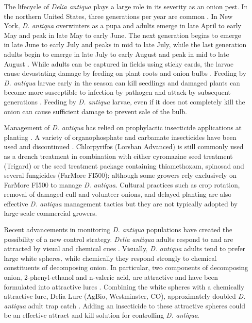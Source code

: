 \documentclass[alpha-refs]{wiley-article}
\begin{document}
The lifecycle of \textit{Delia antiqua} plays a large role in its severity as an onion pest.  In the northern United States, three generations per year are common \citep{eckenrode1975population, hoepting2004insecticide}. In New York, \textit{D. antiqua} overwinters as a pupa and adults emerge in late April to early May and peak in late May to early June. The next generation begins to emerge in late June to early July and peaks in mid to late July, while the last generation adults begin to emerge in late July to early August and peak in mid to late August \citep{nault2011delaying}. While adults can be captured in fields using sticky cards, the larvae cause devastating damage by feeding on plant roots and onion bulbs \citep{nault2006onion, nault2006performance}. Feeding by \textit{D. antiqua} larvae early in the season can kill seedlings and damaged plants can become more susceptible to infection by pathogen and attack by subsequent generations \citep{eckenrode1986impact,nault2006performance}.  Feeding by \textit{D. antiqua} larvae, even if it does not completely kill the onion can cause sufficient damage to prevent sale of the bulb.   

Management of \textit{D. antiqua} has relied on prophylactic insecticide applications at planting \citep{nault2006performance}. A variety of organophosphate and carbamate insecticides have been used and discontinued \citep{nault2006performance}. Chlorpyrifos (Lorsban Advanced) is still commonly used as a drench treatment in combination with either cyromazine seed treatment (Trigard) \citep{nault2006performance,nault2006onion} or the seed treatment package containing thiamethoxam, spinosad and several fungicides (FarMore FI500); although some growers rely exclusively on FarMore FI500 to manage \textit{D. antiqua}. Cultural practices such as crop rotation, removal of damaged cull and volunteer onions, and delayed planting are also effective \textit{D. antiqua} management tactics \citep{martinson1988dispersal,finch1985influence,nault2011delaying} but they are not typically adopted by large-scale commercial growers.   

Recent advancements in monitoring \textit{D. antiqua} populations have created the possibility of a new control strategy. \textit{Delia antiqua} adults respond to and are attracted by visual and chemical cues \citep{harris1988host,harris1983color,thomingdeveloping,otto2000development}. Visually, \textit{D. antiqua} adults tend to prefer large white spheres, while chemically they respond strongly to chemical constituents of decomposing onion. In particular, two components of decomposing onion, 2-phenyl-ethanol and n-valeric acid, are attractive and have been formulated into attractive lures \citep{ishikawa1984mixture,ishikawa1987controlled,kuhar2006field}. Combining the white spheres with a chemically attractive lure, Delia Lure (AgBio, Westminster, CO), approximately doubled \textit{D. antiqua} adult trap catch \citep{willett2019}. Adding an insecticide to these attractive spheres could be an effective attract and kill solution for controlling \textit{D. antiqua}.
\end{document}
